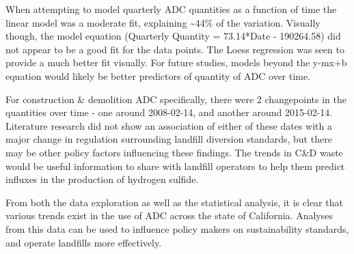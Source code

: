 \documentclass[12pt,]{article}
\begin{document}
When attempting to model quarterly ADC quantities as a function of time
the linear model was a moderate fit, explaining \textasciitilde{}44\% of
the variation. Visually though, the model equation (Quarterly Quantity =
73.14*Date - 190264.58) did not appear to be a good fit for the data
points. The Loess regression was seen to provide a much better fit
visually. For future studies, models beyond the y-mx+b equation would
likely be better predictors of quantity of ADC over time.

For construction \& demolition ADC specifically, there were 2
changepoints in the quantities over time - one around 2008-02-14, and
another around 2015-02-14. Literature research did not show an
association of either of these dates with a major change in regulation
surrounding landfill diversion standards, but there may be other policy
factors influencing these findings. The trends in C\&D waste would be
useful information to share with landfill operators to help them predict
influxes in the production of hydrogen sulfide.

From both the data exploration as well as the statistical analysis, it
is clear that various trends exist in the use of ADC across the state of
California. Analyses from this data can be used to influence policy
makers on sustainability standards, and operate landfills more
effectively.
\end{document}

